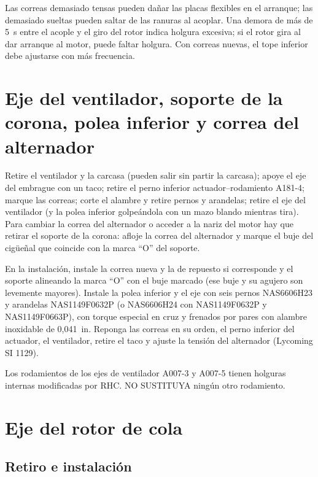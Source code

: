 \begin{precaucion}
Las correas demasiado tensas pueden dañar las placas flexibles en el arranque; las demasiado sueltas pueden saltar de las ranuras al acoplar. Una demora de más de 5~s entre el acople y el giro del rotor indica holgura excesiva; si el rotor gira al dar arranque al motor, puede faltar holgura. Con correas nuevas, el tope inferior debe ajustarse con más frecuencia.
\end{precaucion}

\section{Eje del ventilador, soporte de la corona, polea inferior y correa del alternador}

Retire el ventilador y la carcasa (pueden salir sin partir la carcasa); apoye el eje del embrague con un taco; retire el perno inferior actuador--rodamiento A181-4; marque las correas; corte el alambre y retire pernos y arandelas; retire el eje del ventilador (y la polea inferior golpeándola con un mazo blando mientras tira). Para cambiar la correa del alternador o acceder a la nariz del motor hay que retirar el soporte de la corona: afloje la correa del alternador y marque el buje del cigüeñal que coincide con la marca ``O'' del soporte.

En la instalación, instale la correa nueva y la de repuesto si corresponde y el soporte alineando la marca ``O'' con el buje marcado (ese buje y su agujero son levemente mayores). Instale la polea inferior y el eje con seis pernos NAS6606H23 y arandelas NAS1149F0632P (o NAS6606H24 con NAS1149F0632P y NAS1149F0663P), con torque especial en cruz y frenados por pares con alambre inoxidable de 0,041~in. Reponga las correas en su orden, el perno inferior del actuador, el ventilador, retire el taco y ajuste la tensión del alternador (Lycoming SI 1129).

\begin{advertencia}
Los rodamientos de los ejes de ventilador A007-3 y A007-5 tienen holguras internas modificadas por RHC. NO SUSTITUYA ningún otro rodamiento.
\end{advertencia}

\section{Eje del rotor de cola}

\subsection{Retiro e instalación}


